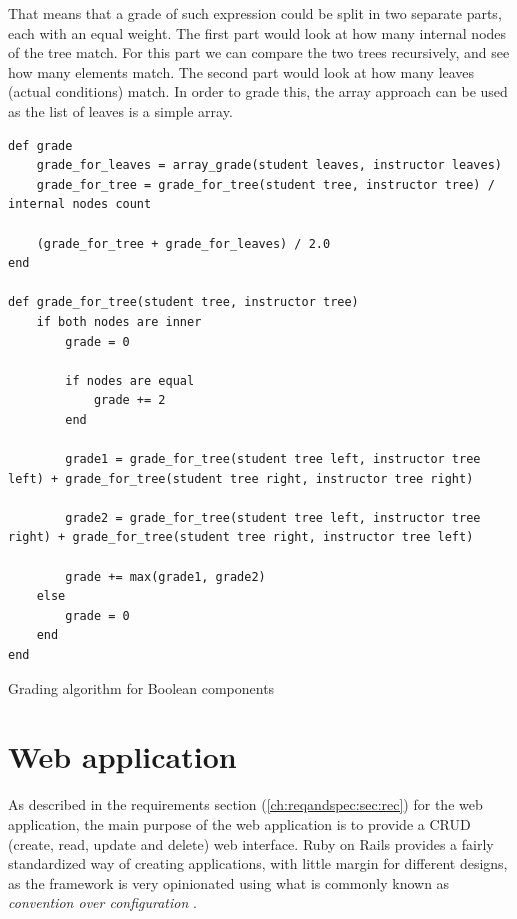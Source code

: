 That means that a grade of such expression could be split in two separate parts, each with an equal weight. The first part would look at how many internal nodes of the tree match. For this part we can compare the two trees recursively, and see how many elements match. The second part would look at how many leaves (actual conditions) match. In order to grade this, the array approach can be used as the list of leaves is a simple array.

\begin{code}
\begin{verbatim}
def grade
    grade_for_leaves = array_grade(student leaves, instructor leaves)
    grade_for_tree = grade_for_tree(student tree, instructor tree) / internal nodes count
    
    (grade_for_tree + grade_for_leaves) / 2.0
end

def grade_for_tree(student tree, instructor tree)
    if both nodes are inner
        grade = 0
        
        if nodes are equal
            grade += 2
        end
        
        grade1 = grade_for_tree(student tree left, instructor tree left) + grade_for_tree(student tree right, instructor tree right)
        
        grade2 = grade_for_tree(student tree left, instructor tree right) + grade_for_tree(student tree right, instructor tree left)
        
        grade += max(grade1, grade2)
    else
        grade = 0
    end
end
\end{verbatim}
\caption{Grading algorithm for Boolean components }
\end{code}

\section{Web application}


As described in the requirements section (\ref{ch:reqandspec:sec:rec}) for the web application, the main purpose of the web application is to provide a CRUD (create, read, update and delete) web interface. Ruby on Rails provides a fairly standardized way of creating applications, with little margin for different designs, as the framework is very opinionated using what is commonly known as \textit{convention over configuration} \citep{ruby_on_rails}.

